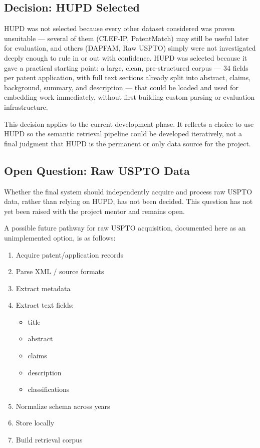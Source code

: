 \documentclass[11pt]{article}
\begin{document}
\subsection{Decision: HUPD Selected}
\label{sec:hupd-decision}

HUPD was not selected because every other dataset considered was proven unsuitable --- several of them (CLEF-IP, PatentMatch) may still be useful later for evaluation, and others (DAPFAM, Raw USPTO) simply were not investigated deeply enough to rule in or out with confidence. HUPD was selected because it gave a practical starting point: a large, clean, pre-structured corpus --- 34 fields per patent application, with full text sections already split into abstract, claims, background, summary, and description --- that could be loaded and used for embedding work immediately, without first building custom parsing or evaluation infrastructure.

This decision applies to the current development phase. It reflects a choice to use HUPD so the semantic retrieval pipeline could be developed iteratively, not a final judgment that HUPD is the permanent or only data source for the project.

\subsection{Open Question: Raw USPTO Data}
\label{sec:raw-uspto}

Whether the final system should independently acquire and process raw USPTO data, rather than relying on HUPD, has not been decided. This question has not yet been raised with the project mentor and remains open.

A possible future pathway for raw USPTO acquisition, documented here as an unimplemented option, is as follows:

\begin{enumerate}
    \item Acquire patent/application records
    \item Parse XML / source formats
    \item Extract metadata
    \item Extract text fields:
    \begin{itemize}
        \item title
        \item abstract
        \item claims
        \item description
        \item classifications
    \end{itemize}
    \item Normalize schema across years
    \item Store locally
    \item Build retrieval corpus
\end{enumerate}
\end{document}
